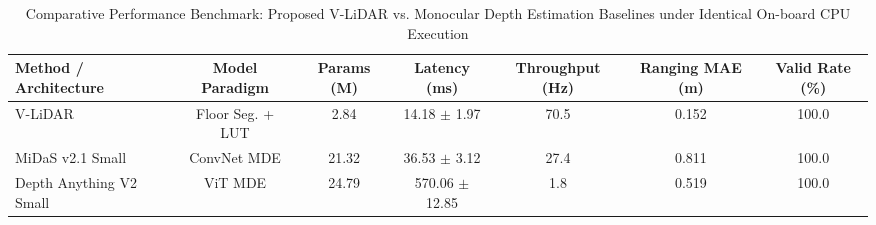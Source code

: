 \begin{table}[!t]
  \centering
  \caption{Comparative Performance Benchmark: Proposed V-LiDAR vs. Monocular Depth Estimation Baselines under Identical On-board CPU Execution}
  \label{tab:baseline_comparison}
  \begin{tabularx}{\textwidth}{lcccccc}
    \toprule
    Method / Architecture & Model Paradigm & Params (M) & Latency (ms) & Throughput (Hz) & Ranging MAE (m) & Valid Rate (\%) \\
    \midrule
    V-LiDAR & Floor Seg. + LUT & 2.84 & 14.18 $\pm$ 1.97 & 70.5 & 0.152 & 100.0 \\
    MiDaS v2.1 Small & ConvNet MDE & 21.32 & 36.53 $\pm$ 3.12 & 27.4 & 0.811 & 100.0 \\
    Depth Anything V2 Small & ViT MDE & 24.79 & 570.06 $\pm$ 12.85 & 1.8 & 0.519 & 100.0 \\
    \bottomrule
  \end{tabularx}
\end{table}
